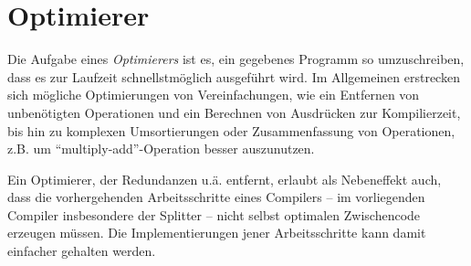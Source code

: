 \documentclass[twoside,a4paper,fleqn,12pt]{book}
\begin{document}
\clearpage
\section{Optimierer}

\newcommand\OptSample[2]{
  \begin{figure}[!h]
    \centering
    \begin{minipage}{8cm}\end{minipage}
    \begin{minipage}{10cm}\end{minipage}
    \vspace{0.3em}
    \begin{minipage}{10cm}\end{minipage}
    \caption{#2.}
    \label{fig:ir_optex_#1}
  \end{figure}
}
\newcommand\OptSampleStacked[2]{
  \begin{figure}[!h]
    \centering
    \begin{minipage}{8cm}\end{minipage}
    \begin{minipage}{10cm}\end{minipage}\\
    \vspace{0.3em}
    \begin{minipage}{10cm}\end{minipage}
    \caption{#2.}
    \label{fig:ir_optex_#1}
  \end{figure}
}

Die Aufgabe eines \emph{Optimierers} ist es, ein gegebenes Programm so umzuschreiben, dass es zur Laufzeit
schnellstmöglich ausgeführt wird. Im Allgemeinen erstrecken sich mögliche Optimierungen von Vereinfachungen,
wie ein Entfernen von unbenötigten Operationen und ein Berechnen von Ausdrücken zur Kompilierzeit,
bis hin zu komplexen Umsortierungen oder Zusammenfassung von Operationen, z.B. um ``multiply-add''-Operation
besser auszunutzen.

Ein Optimierer, der Redundanzen u.ä. entfernt, erlaubt als Nebeneffekt auch, dass die vorhergehenden Arbeitsschritte
eines Compilers -- im vorliegenden Compiler insbesondere der Splitter --
nicht selbst optimalen Zwischencode erzeugen müssen. Die Implementierungen jener Arbeitsschritte kann damit
einfacher gehalten werden.
\end{document}
